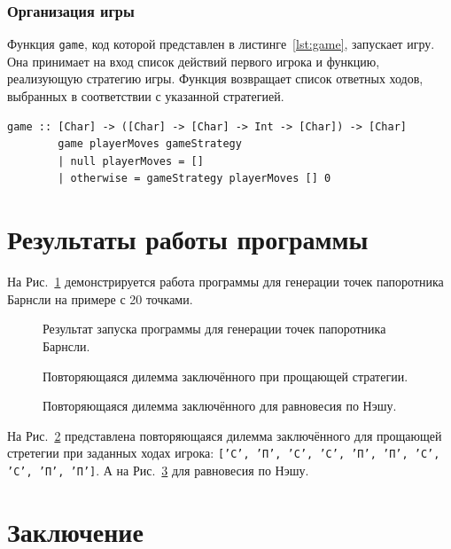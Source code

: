 \documentclass[a4paper, final]{article}
\begin{document}
	
	\subsubsection{Организация игры}
	Функция \texttt{game}, код которой представлен в листинге~\ref{lst:game}, запускает игру. Она принимает на вход список действий первого игрока и функцию, реализующую стратегию игры. Функция возвращает список ответных ходов, выбранных в соответствии с указанной стратегией.
	
	\begin{lstlisting}[caption={Код функции для подсчёта лет заключения.}, label={lst:game}]
		game :: [Char] -> ([Char] -> [Char] -> Int -> [Char]) -> [Char]
		game playerMoves gameStrategy
		| null playerMoves = []
		| otherwise = gameStrategy playerMoves [] 0
	\end{lstlisting}
	
	
	\newpage
	\section {Результаты работы программы}
	
	На Рис.~\ref{fig:output1} демонстрируется работа программы для генерации точек папоротника Барнсли на примере с 20 точками.
	
	\begin{figure}[h]
		\centering
		\caption{Результат запуска программы для генерации точек папоротника Барнсли.}
		\label{fig:output1}
	\end{figure}
	
	\begin{figure}[h]
		\centering
		\caption{Повторяющаяся дилемма заключённого при прощающей стратегии.}
		\label{fig:output2}
	\end{figure}
	
	\begin{figure}[h]
		\centering
		\caption{Повторяющаяся дилемма заключённого для равновесия по Нэшу.}
		\label{fig:output3}
	\end{figure}
	
	На Рис.~\ref{fig:output2} представлена повторяющаяся дилемма заключённого для прощающей стретегии при заданных ходах игрока: \texttt{['С', 'П', 'С', 'С', 'П', 'П', 'С', 'С', 'П', 'П']}. А на Рис.~\ref{fig:output3} для равновесия по Нэшу. 
	
	\newpage
	\section*{Заключение}
	
\end{document}
